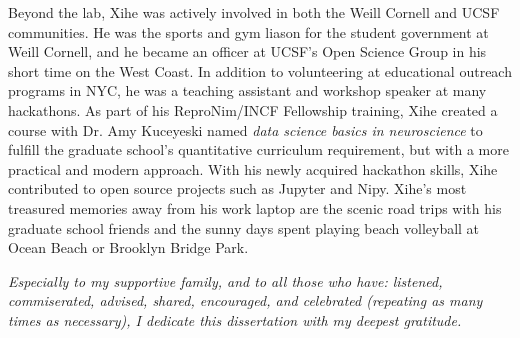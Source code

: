\documentclass[phd,tocprelim]{cornell}
\begin{document}
\begin{biosketch}
Beyond the lab, Xihe was actively involved in both the Weill Cornell and UCSF communities. He was the sports and gym liason for the student government at Weill Cornell, and he became an officer at UCSF's Open Science Group in his short time on the West Coast. In addition to volunteering at educational outreach programs in NYC, he was a teaching assistant and workshop speaker at many hackathons. As part of his ReproNim/INCF Fellowship training, Xihe created a course with Dr. Amy Kuceyeski named \emph{data science basics in neuroscience} to fulfill the graduate school's quantitative curriculum requirement, but with a more practical and modern approach. With his newly acquired hackathon skills, Xihe contributed to open source projects such as Jupyter and Nipy. Xihe's most treasured memories away from his work laptop are the scenic road trips with his graduate school friends and the sunny days spent playing beach volleyball at Ocean Beach or Brooklyn Bridge Park.
\end{biosketch}

\begin{dedication}
\emph{Especially to my supportive family, and to all those who have: listened, commiserated, advised, shared, encouraged, and celebrated (repeating as many times as necessary), I dedicate this dissertation with my deepest gratitude.}
\end{dedication}
\end{document}
